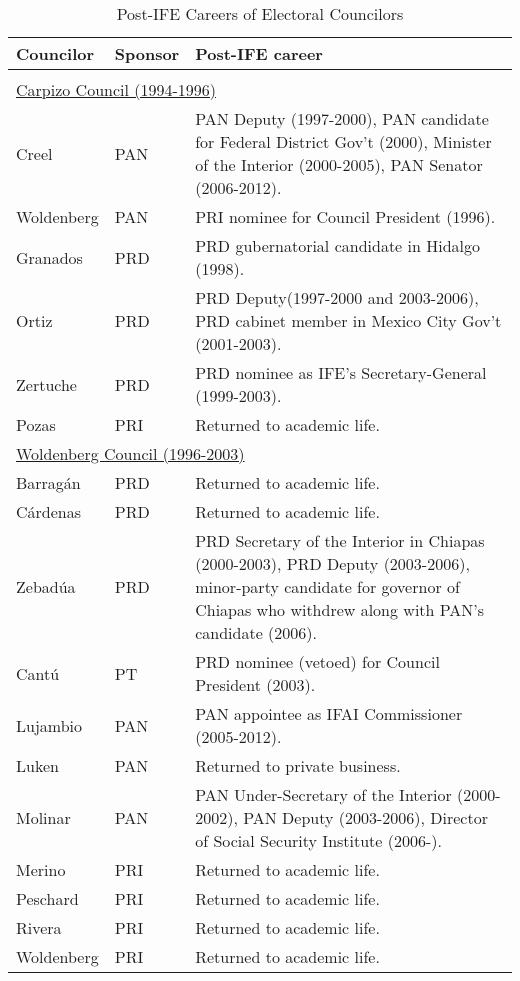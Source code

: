 \documentclass[12 pt, letter]{article}
\begin{document}
\begin{table}
\caption{Post-IFE Careers of Electoral Councilors}\label{T:postife}
\begin{center}
\begin{tabular}{llp{3in}}
\hline
Councilor & Sponsor & Post-IFE career \\ \hline \\ [-1.5ex]
\multicolumn{3}{l}{\underline{Carpizo Council (1994-1996)}}\\  [1.2ex]
Creel       & PAN & PAN Deputy (1997-2000), PAN candidate for Federal District Gov't (2000), Minister of the Interior (2000-2005), PAN Senator (2006-2012). \\ [0.5ex]
Woldenberg  & PAN & PRI nominee for Council President (1996). \\ [0.5ex]
Granados    & PRD & PRD gubernatorial candidate in Hidalgo (1998). \\ [0.5ex]
Ortiz       & PRD & PRD Deputy(1997-2000 and 2003-2006), PRD cabinet member in Mexico City Gov't (2001-2003). \\ [0.5ex]
Zertuche    & PRD & PRD nominee as IFE's Secretary-General (1999-2003). \\ [0.5ex]
Pozas       & PRI & Returned to academic life. \\ [1.2ex]
\multicolumn{3}{l}{\underline{Woldenberg Council (1996-2003)}}\\ [1.2ex]
Barrag\'an  & PRD & Returned to academic life. \\ [0.5ex]
C\'ardenas  & PRD & Returned to academic life. \\ [0.5ex]
Zebad\'ua   & PRD & PRD Secretary of the Interior in Chiapas (2000-2003), PRD Deputy (2003-2006), minor-party candidate for governor of Chiapas who withdrew along with PAN's candidate (2006). \\ [0.5ex]
Cant\'u     & PT  & PRD nominee (vetoed) for Council President (2003). \\ [0.5ex]
Lujambio    & PAN & PAN appointee as IFAI Commissioner (2005-2012). \\ [0.5ex]
Luken       & PAN & Returned to private business. \\ [0.5ex]
Molinar     & PAN & PAN Under-Secretary of the Interior (2000-2002), PAN Deputy (2003-2006), Director of Social Security Institute (2006-). \\ [0.5ex]
Merino      & PRI & Returned to academic life. \\ [0.5ex]
Peschard    & PRI & Returned to academic life. \\ [0.5ex]
Rivera      & PRI & Returned to academic life. \\ [0.5ex]
Woldenberg  & PRI & Returned to academic life. \\ \hline
\end{tabular}
\end{center}
\end{table}
\end{document}
